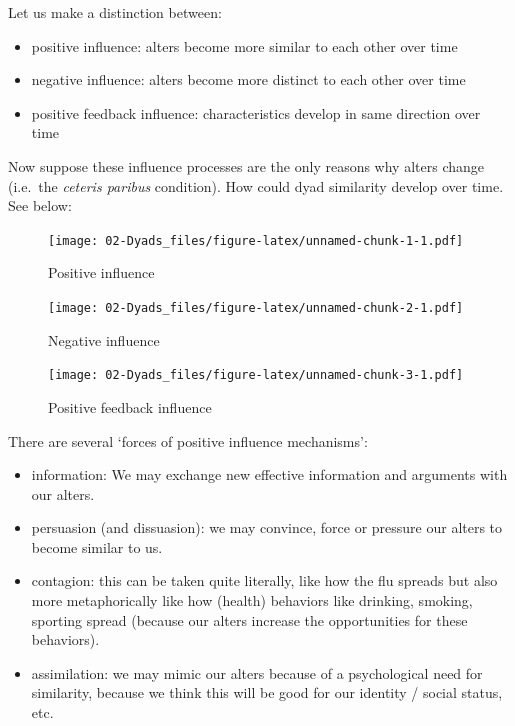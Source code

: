 \documentclass[
]{book}
\providecommand{\tightlist}{%
  \setlength{\itemsep}{0pt}\setlength{\parskip}{0pt}}
\begin{document}
Let us make a distinction between:

\begin{itemize}
\tightlist
\item
  positive influence: alters become more similar to each other over time\\
\item
  negative influence: alters become more distinct to each other over time
\item
  positive feedback influence: characteristics develop in same direction over time
\end{itemize}

Now suppose these influence processes are the only reasons why alters change (i.e.~the \emph{ceteris paribus} condition). How could dyad similarity develop over time. See below:

\begin{figure}
\centering
\texttt{[image: 02-Dyads\_files/figure-latex/unnamed-chunk-1-1.pdf]}
\caption{\label{fig:unnamed-chunk-1}Positive influence}
\end{figure}

\begin{figure}
\centering
\texttt{[image: 02-Dyads\_files/figure-latex/unnamed-chunk-2-1.pdf]}
\caption{\label{fig:unnamed-chunk-2}Negative influence}
\end{figure}

\begin{figure}
\centering
\texttt{[image: 02-Dyads\_files/figure-latex/unnamed-chunk-3-1.pdf]}
\caption{\label{fig:unnamed-chunk-3}Positive feedback influence}
\end{figure}

There are several `forces of positive influence mechanisms':

\begin{itemize}
\tightlist
\item
  information: We may exchange new effective information and arguments with our alters.
\item
  persuasion (and dissuasion): we may convince, force or pressure our alters to become similar to us.\\
\item
  contagion: this can be taken quite literally, like how the flu spreads but also more metaphorically like how (health) behaviors like drinking, smoking, sporting spread (because our alters increase the opportunities for these behaviors).\\
\item
  assimilation: we may mimic our alters because of a psychological need for similarity, because we think this will be good for our identity / social status, etc.
\end{itemize}
\end{document}
